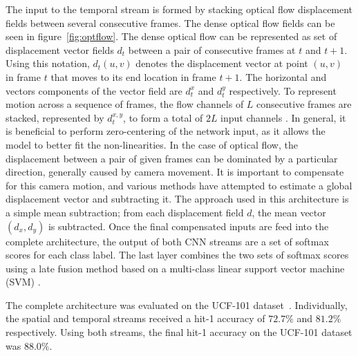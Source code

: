 The input to the temporal stream is formed by stacking optical flow displacement fields between several consecutive frames. The dense optical flow fields can be seen in figure~\ref{fig:optflow}. The dense optical flow can be represented as set of displacement vector fields $d_t$ between a pair of consecutive frames at $t$ and $t+1$. Using this notation, $d_t(u,v)$ denotes the displacement vector at point $(u,v)$ in frame $t$ that moves to its end location in frame $t+1$. The horizontal and vectors components of the vector field are $d_t^x$ and $d_t^y$ respectively. To represent motion across a sequence of frames, the flow channels of $L$ consecutive frames are stacked, represented by $d_t^{x,y}$, to form a total of $2L$ input channels \cite{TwoStream:2014}. In general, it is beneficial to perform zero-centering of the network input, as it allows the model to better fit the non-linearities. In the case of optical flow, the displacement between a pair of given frames can be dominated by a particular direction, generally caused by camera movement. It is important to compensate for this camera motion, and various methods have attempted to estimate a global displacement vector and subtracting it. The approach used in this architecture is a simple mean subtraction; from each displacement field $d$, the mean vector $(d_x, d_y)$ is subtracted. Once the final compensated inputs are feed into the complete architecture, the output of both CNN streams are a set of softmax scores for each class label. The last layer combines the two sets of softmax scores using a late fusion method based on a multi-class linear support vector machine (SVM) \cite{LinearSVM:2002}.

The complete architecture was evaluated on the UCF-101 dataset~\cite{UCF-101}. Individually, the spatial and temporal streams received a hit-1 accuracy of $72.7\%$ and $81.2\%$ respectively. Using both streams, the final hit-1 accuracy on the UCF-101 dataset was $88.0\%$.


